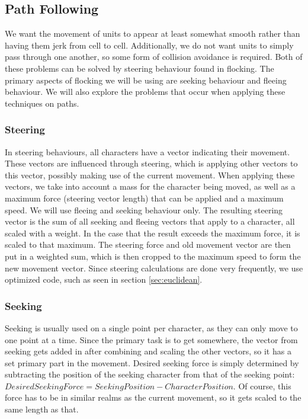 \subsection{Path Following}
\label{sec:pathfollowing}
We want the movement of units to appear at least somewhat smooth rather than having them jerk from cell to cell. Additionally, we do not want units to simply pass through one another, so some form of collision avoidance is required. Both of these problems can be solved by steering behaviour found in flocking. The primary aspects of flocking we will be using are seeking behaviour and fleeing behaviour. We will also explore the problems that occur when applying these techniques on paths.

\subsubsection{Steering}
In steering behaviours, all characters have a vector indicating their movement. These vectors are influenced through steering, which is applying other vectors to this vector, possibly making use of the current movement. When applying these vectors, we take into account a mass for the character being moved, as well as a maximum force (steering vector length) that can be applied and a maximum speed. We will use fleeing and seeking behaviour only. The resulting steering vector is the sum of all seeking and fleeing vectors that apply to a character, all scaled with a weight. In the case that the result exceeds the maximum force, it is scaled to that maximum. The steering force and old movement vector are then put in a weighted sum, which is then cropped to the maximum speed to form the new movement vector. Since steering calculations are done very frequently, we use optimized code, such as seen in section \ref{sec:euclidean}.

\subsubsection{Seeking}
Seeking is usually used on a single point per character, as they can only move to one point at a time. Since the primary task is to get somewhere, the vector from seeking gets added in after combining and scaling the other vectors, so it has a set primary part in the movement. Desired seeking force is simply determined by subtracting the position of the seeking character from that of the seeking point: $DesiredSeekingForce = SeekingPosition - CharacterPosition$. Of course, this force has to be in similar realms as the current movement, so it gets scaled to the same length as that.

